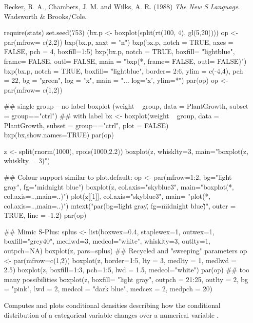 %
\begin{References}\relax
Becker, R. A., Chambers, J. M. and Wilks, A. R. (1988)
\emph{The New S Language}.
Wadsworth \& Brooks/Cole.
\end{References}
%
\begin{Examples}
\begin{ExampleCode}
require(stats)
set.seed(753)
(bx.p <- boxplot(split(rt(100, 4), gl(5,20))))
op <- par(mfrow= c(2,2))
bxp(bx.p, xaxt = "n")
bxp(bx.p, notch = TRUE, axes = FALSE, pch = 4, boxfill=1:5)
bxp(bx.p, notch = TRUE, boxfill= "lightblue", frame= FALSE,
    outl= FALSE, main = "bxp(*, frame= FALSE, outl= FALSE)")
bxp(bx.p, notch = TRUE, boxfill= "lightblue", border= 2:6,
    ylim = c(-4,4), pch = 22, bg = "green", log = "x",
    main = "... log='x', ylim=*")
par(op)
op <- par(mfrow= c(1,2))

## single group -- no label
boxplot (weight ~ group, data = PlantGrowth, subset = group=="ctrl")
## with label
bx <- boxplot(weight ~ group, data = PlantGrowth,
              subset = group=="ctrl", plot = FALSE)
bxp(bx,show.names=TRUE)
par(op)


z <- split(rnorm(1000), rpois(1000,2.2))
boxplot(z, whisklty=3, main="boxplot(z, whisklty = 3)")

## Colour support similar to plot.default:
op <- par(mfrow=1:2, bg="light gray", fg="midnight blue")
boxplot(z,   col.axis="skyblue3", main="boxplot(*, col.axis=..,main=..)")
plot(z[[1]], col.axis="skyblue3", main=   "plot(*, col.axis=..,main=..)")
mtext("par(bg=\"light gray\", fg=\"midnight blue\")",
      outer = TRUE, line = -1.2)
par(op)

## Mimic S-Plus:
splus <- list(boxwex=0.4, staplewex=1, outwex=1, boxfill="grey40",
              medlwd=3, medcol="white", whisklty=3, outlty=1, outpch=NA)
boxplot(z, pars=splus)
## Recycled and "sweeping" parameters
op <- par(mfrow=c(1,2))
 boxplot(z, border=1:5, lty = 3, medlty = 1, medlwd = 2.5)
 boxplot(z, boxfill=1:3, pch=1:5, lwd = 1.5, medcol="white")
par(op)
## too many possibilities
boxplot(z, boxfill= "light gray", outpch = 21:25, outlty = 2,
        bg = "pink", lwd = 2,
        medcol = "dark blue", medcex = 2, medpch = 20)
\end{ExampleCode}
\end{Examples}
%
\begin{Description}\relax
Computes and plots conditional densities describing how the
conditional distribution of a categorical variable  changes over a
numerical variable .
\end{Description}
